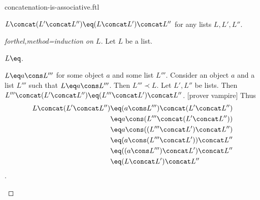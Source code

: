 \documentclass{stex}
\begin{document}
\begin{smodule}[title=Concatenation is Associative]{concatenation-is-associative.ftl}


\begin{proposition}[forthel,id=ConcatIsAssociativeProp]
  $L \concat (L' \concat L'') \eq (L \concat L') \concat L''$ for any lists $L, L', L''$.
\end{proposition}
\begin{proof}[forthel,method=induction on $L$]
  Let $L$ be a list.

  \begin{case}{$L \eq \list{}$.} \end{case}

  \begin{case}{$L \eq a \cons L'''$ for some object $a$ and some list $L'''$.}
    Consider an object $a$ and a list $L'''$ such that $L \eq a \cons L'''$.
    Then $L''' \prec L$.
    Let $L',L''$ be lists.
    Then $L''' \concat (L' \concat L'') \eq (L''' \concat L') \concat L''$.
    [prover vampire]
    Thus
    \begin{align*}
      L \concat (L' \concat L'') 
        &\eq (a \cons L''') \concat (L' \concat L'')\\
        &\eq a \cons (L''' \concat (L' \concat L''))\\
        &\eq a \cons ((L''' \concat L') \concat L'')\\
        &\eq (a \cons (L''' \concat L')) \concat L''\\
        &\eq ((a \cons L''') \concat L') \concat L''\\
        &\eq (L \concat L') \concat L''
    \end{align*}.
  \end{case}
\end{proof}

\end{smodule}
\end{document}
